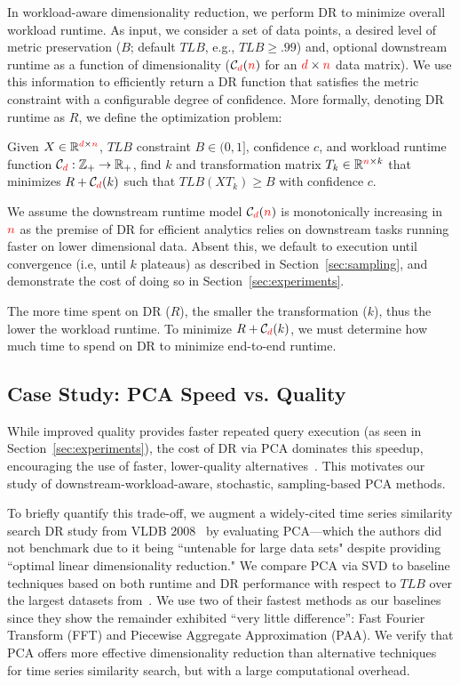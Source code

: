 In workload-aware dimensionality reduction, we perform DR to minimize overall workload runtime. As input, we consider a set of data points, a desired level of metric preservation ($B$; default $TLB$, e.g., $TLB \geq .99$) and, optional downstream runtime as a function of dimensionality ($\mathcal{C}_{\color{red}d}({\color{red}n})$ for an ${\color{red}d}\times {\color{red}n}$ data matrix).  
We use this information to efficiently return a DR function that satisfies the metric constraint with a configurable degree of confidence.
More formally, denoting DR runtime as $R$, we define the optimization problem:
\begin{problem}
\label{def:opt}
  Given $X \in \mathbb{R}^{{\color{red}d} \times {\color{red}n}}$, $TLB$ constraint $B \in 
  (0, 1]$, confidence $c$, and workload runtime function $\mathcal{C}_{\color{red}d}:\mathbb{Z}_{+} \rightarrow \mathbb{R}_{+}$, find $k$ and transformation
  matrix $T_k \in \mathbb{R}^{{\color{red}n} \times k}$ that minimizes $R + \mathcal{C}_{\color{red}d}(k)$
  such that $TLB(XT_k) \geq B$ with confidence $c$.
\end{problem}

We assume the downstream runtime model $\mathcal{C}_{\color{red}d}({\color{red}n})$ is monotonically increasing in ${\color{red}n}$ as the premise of DR for efficient analytics relies on downstream tasks running faster on lower dimensional data.
Absent this, we default to execution until convergence (i.e, until $k$ plateaus) as described in Section~\ref{sec:sampling}, and demonstrate the cost of doing so in Section~\ref{sec:experiments}.

The more time spent on DR ($R$), the smaller the transformation ($k$), thus the lower the workload runtime.
To minimize $R + \mathcal{C}_{\color{red}d}(k)$, we must determine how much time to spend on DR to minimize end-to-end runtime.


\subsection{Case Study: PCA Speed vs. Quality}

While improved quality provides faster repeated query execution (as seen in Section~\ref{sec:experiments}), the cost of DR via PCA dominates this speedup, encouraging the use of faster, lower-quality alternatives~\cite{keogh-study}. 
This motivates our study of downstream-workload-aware, stochastic, sampling-based PCA methods.

To briefly quantify this trade-off, we augment a widely-cited time series similarity search DR study from VLDB 2008~\cite{keogh-study} by evaluating PCA---which the authors did not benchmark due to it being ``untenable for large data sets" despite providing ``optimal linear dimensionality reduction."
We compare PCA via SVD to baseline techniques based on both runtime and DR performance with respect to $TLB$ over the largest datasets from~\cite{keogh-study}. 
We use two of their fastest methods as our baselines since they show the remainder exhibited ``very little difference'': Fast Fourier Transform (FFT) and Piecewise Aggregate Approximation (PAA).
We verify that PCA offers more effective dimensionality reduction than alternative techniques for time series similarity search, but with a large computational overhead. 


